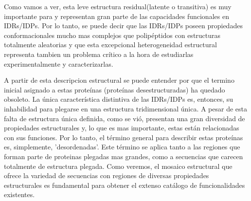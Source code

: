 Como vamos a ver, esta leve estructura residual(latente o transitiva) es muy importante para y representan gran parte de las capacidades funcionales en IDRs/IDPs.
Por lo tanto, se puede decir que las IDRs/IDPs poseen propiedades conformacionales mucho mas complejos que polipéptidos con estructuras totalmente aleatorias y que esta excepcional heterogeneidad estructural
representa tambien un problema crítico a la hora de estudiarlas experimentalmente y caracterizarlas.


A partir de esta descripcion estructural se puede entender por que el termino inicial asignado a estas proteínas (proteínas desestructuradas) ha quedado obsoleto.
La única característica distintiva de las IDRs/IDPs es, entonces, su inhabilidad para plegarse en una estructura tridimensional única.
A pesar de esta falta de estructura única definida, como se vió, presentan una gran diversidad de propiedades estructurales y, lo que es mas importante, estas están relacionadas con sus funciones. 
Por lo tanto, el término general para describir estas proteínas es, simplemente, 'desordenadas'.
Este término se aplica tanto a las regiones que forman parte de proteinas plegadas mas grandes, como a secuencias que carecen totalmente de estructura plegada. 
Como veremos, el mosaico estructural que ofrece la variedad de secuencias con regiones de diversas propiedades estructurales es fundamental para obtener el extenso catálogo de funcionalidades existentes.    




